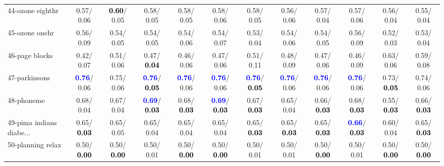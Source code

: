 \begin{table}[h]
\begin{center}
{\begin{tabular}{lc|c|c|c|c|c|c|c|c|c|c}
44-ozone eighthr &   0.57/  0.06 & \textcolor{black}{\textbf{  0.60}}/  0.05 &   0.58/  0.05 &   0.58/  0.05 &   0.58/  0.06 &   0.58/  0.05 &   0.56/  0.06 &   0.57/  0.04 &   0.57/  0.06 &   0.56/  0.04 &   0.55/  0.04 \\
45-ozone onehr &   0.56/  0.09 &   0.54/  0.05 &   0.54/  0.05 &   0.54/  0.06 &   0.54/  0.07 &   0.53/  0.04 &   0.54/  0.06 &   0.54/  0.05 &   0.56/  0.09 &   0.52/  0.03 &   0.53/  0.04 \\
46-page blocks &   0.42/  0.07 &   0.51/  0.06 &   0.47/\textcolor{black}{\textbf{  0.04}} &   0.46/  0.06 &   0.47/  0.06 &   0.51/  0.11 &   0.48/  0.09 &   0.47/  0.06 &   0.46/  0.09 &   0.63/  0.06 &   0.59/  0.08 \\ \hline
47-parkinsons & \textcolor{blue}{\textbf{  0.76}}/  0.06 &   0.75/  0.06 & \textcolor{blue}{\textbf{  0.76}}/\textcolor{black}{\textbf{  0.05}} & \textcolor{blue}{\textbf{  0.76}}/  0.06 & \textcolor{blue}{\textbf{  0.76}}/  0.06 & \textcolor{blue}{\textbf{  0.76}}/\textcolor{black}{\textbf{  0.05}} & \textcolor{blue}{\textbf{  0.76}}/  0.06 & \textcolor{blue}{\textbf{  0.76}}/  0.06 & \textcolor{blue}{\textbf{  0.76}}/  0.06 &   0.73/\textcolor{black}{\textbf{  0.05}} &   0.74/  0.06 \\
48-phoneme &   0.68/  0.04 &   0.67/  0.04 & \textcolor{blue}{\textbf{  0.69}}/\textcolor{black}{\textbf{  0.03}} &   0.68/\textcolor{black}{\textbf{  0.03}} & \textcolor{blue}{\textbf{  0.69}}/\textcolor{black}{\textbf{  0.03}} &   0.67/\textcolor{black}{\textbf{  0.03}} &   0.65/  0.04 &   0.66/\textcolor{black}{\textbf{  0.03}} &   0.68/\textcolor{black}{\textbf{  0.03}} &   0.55/\textcolor{black}{\textbf{  0.03}} &   0.66/\textcolor{black}{\textbf{  0.03}} \\
49-pima indians diabe... &   0.65/\textcolor{black}{\textbf{  0.03}} &   0.65/  0.05 &   0.65/  0.04 &   0.65/  0.04 &   0.65/  0.04 &   0.65/\textcolor{black}{\textbf{  0.03}} &   0.65/\textcolor{black}{\textbf{  0.03}} &   0.65/\textcolor{black}{\textbf{  0.03}} & \textcolor{blue}{\textbf{  0.66}}/\textcolor{black}{\textbf{  0.03}} &   0.60/  0.04 &   0.65/\textcolor{black}{\textbf{  0.03}} \\
50-planning relax &   0.50/\textcolor{black}{\textbf{  0.00}} &   0.50/\textcolor{black}{\textbf{  0.00}} &   0.50/  0.01 &   0.50/\textcolor{black}{\textbf{  0.00}} &   0.50/\textcolor{black}{\textbf{  0.00}} &   0.50/  0.01 &   0.50/  0.01 &   0.50/\textcolor{black}{\textbf{  0.00}} &   0.50/  0.01 &   0.50/\textcolor{black}{\textbf{  0.00}} &   0.50/\textcolor{black}{\textbf{  0.00}} \\

\end{tabular}}
\end{center}
\end{table}
